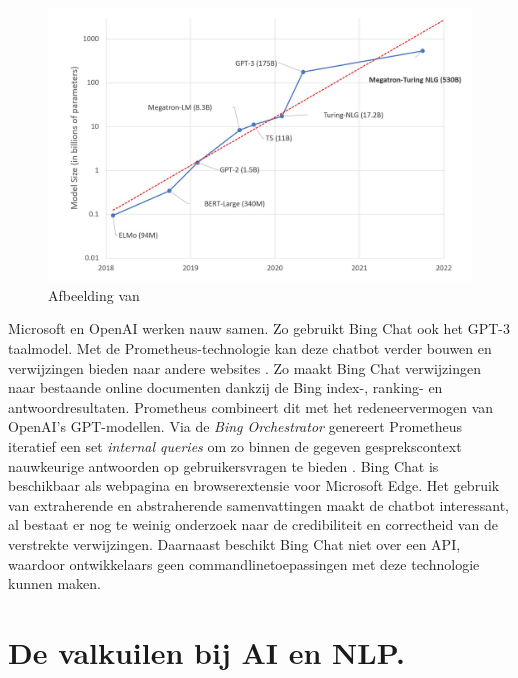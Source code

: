 \begin{figure}[H]
	\begin{center}
		\includegraphics[width=\linewidth]{img/graph-language-models.png}
		\caption{Afbeelding van \textcite{Simon2021}}
		\label{img:graph-language-models}
	\end{center}
\end{figure}

Microsoft en OpenAI werken nauw samen. Zo gebruikt Bing Chat ook het GPT-3 taalmodel. Met de Prometheus-technologie kan deze chatbot verder bouwen en verwijzingen bieden naar andere websites \autocite{Ribas2023}. Zo maakt Bing Chat verwijzingen naar bestaande online documenten dankzij de Bing index-, ranking- en antwoordresultaten. Prometheus combineert dit met het redeneervermogen van OpenAI’s GPT-modellen. Via de \textit{Bing Orchestrator} genereert Prometheus iteratief een set \textit{internal queries} om zo binnen de gegeven gesprekscontext nauwkeurige antwoorden op gebruikersvragen te bieden \autocite{Ribas2023}. Bing Chat is beschikbaar als webpagina en browserextensie voor Microsoft Edge. Het gebruik van extraherende en abstraherende samenvattingen maakt de chatbot interessant, al bestaat er nog te weinig onderzoek naar de credibiliteit en correctheid van de verstrekte verwijzingen. Daarnaast beschikt Bing Chat niet over een API, waardoor ontwikkelaars geen commandlinetoepassingen met deze technologie kunnen maken.



\section{De valkuilen bij AI en NLP.}


